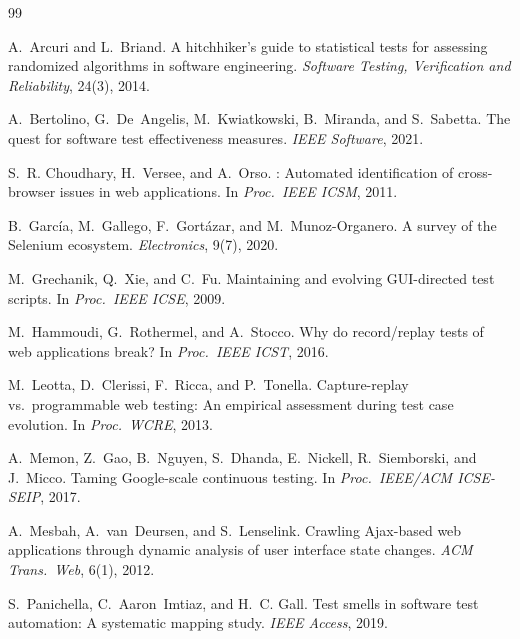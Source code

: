 \documentclass[12pt]{article}
\begin{document}

\begin{thebibliography}{99}

A.~Arcuri and L.~Briand.
\newblock A hitchhiker's guide to statistical tests for assessing randomized algorithms in software engineering.
\newblock \emph{Software Testing, Verification and Reliability}, 24(3), 2014.

A.~Bertolino, G.~De~Angelis, M.~Kwiatkowski, B.~Miranda, and S.~Sabetta.
\newblock The quest for software test effectiveness measures.
\newblock \emph{IEEE Software}, 2021.

S.~R. Choudhary, H.~Versee, and A.~Orso.
: Automated identification of cross-browser issues in web applications.
\newblock In \emph{Proc.\ IEEE ICSM}, 2011.

B.~Garc\'ia, M.~Gallego, F.~Gort\'azar, and M.~Munoz-Organero.
\newblock A survey of the {Selenium} ecosystem.
\newblock \emph{Electronics}, 9(7), 2020.

M.~Grechanik, Q.~Xie, and C.~Fu.
\newblock Maintaining and evolving {GUI}-directed test scripts.
\newblock In \emph{Proc.\ IEEE ICSE}, 2009.

M.~Hammoudi, G.~Rothermel, and A.~Stocco.
\newblock Why do record/replay tests of web applications break?
\newblock In \emph{Proc.\ IEEE ICST}, 2016.

M.~Leotta, D.~Clerissi, F.~Ricca, and P.~Tonella.
\newblock Capture-replay vs.\ programmable web testing: An empirical assessment during test case evolution.
\newblock In \emph{Proc.\ WCRE}, 2013.

A.~Memon, Z.~Gao, B.~Nguyen, S.~Dhanda, E.~Nickell, R.~Siemborski, and J.~Micco.
\newblock Taming {Google}-scale continuous testing.
\newblock In \emph{Proc.\ IEEE/ACM ICSE-SEIP}, 2017.

A.~Mesbah, A.~van~Deursen, and S.~Lenselink.
\newblock Crawling {Ajax}-based web applications through dynamic analysis of user interface state changes.
\newblock \emph{ACM Trans.\ Web}, 6(1), 2012.

S.~Panichella, C.~Aaron~Imtiaz, and H.~C. Gall.
\newblock Test smells in software test automation: A systematic mapping study.
\newblock \emph{IEEE Access}, 2019.


\end{thebibliography}
\end{document}
